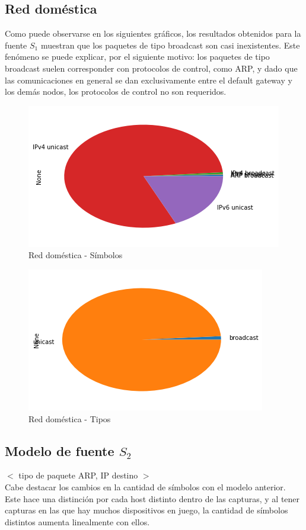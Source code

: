 \subsection{Red doméstica}

Como puede observarse en los siguientes gráficos, los resultados obtenidos para la fuente $S_1$ muestran que los paquetes de tipo broadcast son casi inexistentes. Este fenómeno se puede explicar, por el siguiente motivo: los paquetes de tipo broadcast suelen corresponder con protocolos de control, como ARP, y dado que las comunicaciones en general se dan exclusivamente entre el default gateway y los demás nodos, los protocolos de control no son requeridos.

\begin{figure}[H]
	\centering
	\includegraphics[width=.5\linewidth]{imagenes/manu_casa_torta_simbolos}
	\caption{Red doméstica - Símbolos}
\end{figure}

\begin{figure}[H]
	\centering
	\includegraphics[width=.5\linewidth]{imagenes/manu_casa_torta_tipos}
	\caption{Red doméstica - Tipos}
\end{figure}


\subsection{Modelo de fuente $S_2$}


$<$ tipo de paquete ARP, IP destino $>$ \\


Cabe destacar los cambios en la cantidad de símbolos con el modelo anterior. Este hace una distinción por cada host distinto dentro de las capturas, y al tener capturas en las que hay muchos dispositivos en juego, la cantidad de símbolos distintos aumenta linealmente con ellos.

